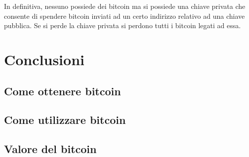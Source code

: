In definitiva, nessuno possiede dei bitcoin ma si possiede una chiave privata che consente di spendere bitcoin inviati
ad un certo indirizzo relativo ad una chiave pubblica. Se si perde la chiave privata si perdono tutti i bitcoin
legati ad essa.

\section{Conclusioni}
\subsection{Come ottenere bitcoin}
\subsection{Come utilizzare bitcoin}
\subsection{Valore del bitcoin}
